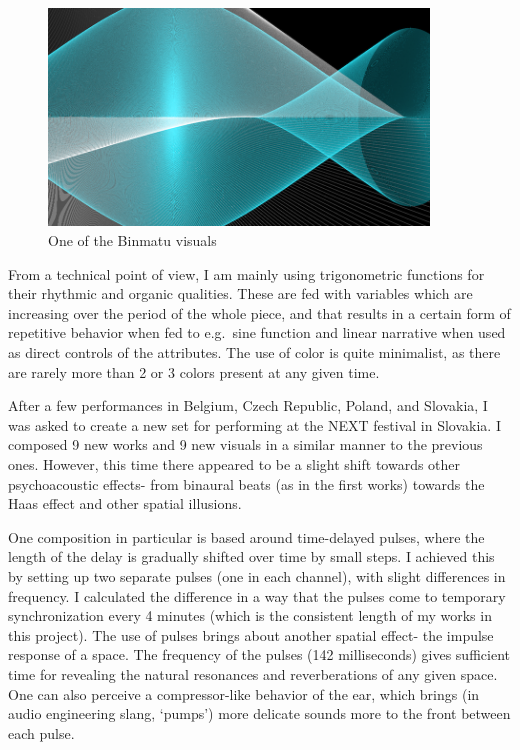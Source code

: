 \documentclass[12pt,a4paper,oneside]{report}
\begin{document}
\begin{figure}  
  \centering
    \includegraphics[width=0.9\textwidth]{img/binmatu}
        \caption{One of the Binmatu visuals}
        \label{fig:binmatu}
\end{figure}

From a technical point of view, I am mainly using trigonometric functions for their rhythmic and organic qualities. These are fed with variables which are increasing over the period of the whole piece, and that results in a certain form of repetitive behavior when fed to e.g.\ sine function and linear narrative when used as direct controls of the attributes. The use of color is quite minimalist, as there are rarely more than 2 or 3 colors present at any given time.

After a few performances in Belgium, Czech Republic, Poland, and Slovakia, I was asked to create a new set for performing at the NEXT festival in Slovakia. I composed 9 new works and 9 new visuals in a similar manner to the previous ones. However, this time there appeared to be a slight shift towards other psychoacoustic effects- from binaural beats (as in the first works) towards the Haas effect and other spatial illusions.

One composition in particular is based around time-delayed pulses, where the length of the delay is gradually shifted over time by small steps. I achieved this by setting up two separate pulses (one in each channel), with slight differences in frequency. I calculated the difference in a way that the pulses come to temporary synchronization every 4 minutes (which is the consistent length of my works in this project). The use of pulses brings about another spatial effect- the impulse response of a space. The frequency of the pulses (142 milliseconds) gives sufficient time for revealing the natural resonances and reverberations of any given space. One can also perceive a compressor-like behavior of the ear, which brings (in audio engineering slang, `pumps') more delicate sounds more to the front between each pulse.
\end{document}
